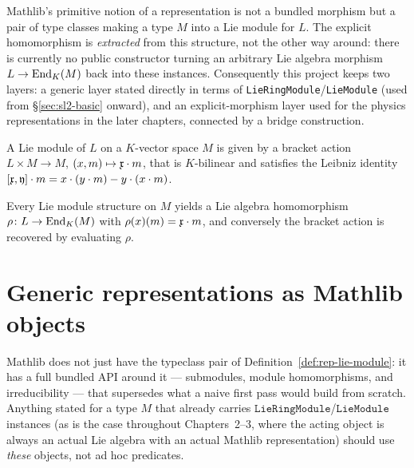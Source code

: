 Mathlib's primitive notion of a representation is not a bundled morphism but
a pair of type classes making a type $M$ into a Lie module for $L$. The
explicit homomorphism is \emph{extracted} from this structure, not the other
way around: there is currently no public constructor turning an arbitrary Lie
algebra morphism $L \to \operatorname{End}_K(M)$ back into these instances. Consequently
this project keeps two layers: a generic layer stated directly in terms of
\texttt{LieRingModule}/\texttt{LieModule} (used from \S\ref{sec:sl2-basic}
onward), and an explicit-morphism layer used for the physics representations
in the later chapters, connected by a bridge construction.

\begin{definition}
  \label{def:rep-lie-module}
  \mathlibok
  A Lie module of $L$ on a $K$-vector space $M$ is given by a bracket action
  $L \times M \to M$, $(x, m) \mapsto \mathfrak{x}\cdot m$, that is $K$-bilinear
  and satisfies the Leibniz identity
  $\mathfrak{[x,y]}\cdot m = x \cdot (y \cdot m) - y \cdot (x \cdot m)$.
\end{definition}

\begin{definition}
  \label{def:rep-to-end}
  \mathlibok
  Every Lie module structure on $M$ yields a Lie algebra homomorphism
  $\rho \colon L \to \operatorname{End}_K(M)$ with $\rho(x)(m) = \mathfrak{x}\cdot m$, and
  conversely the bracket action is recovered by evaluating $\rho$.
\end{definition}

\section{Generic representations as Mathlib objects}
\label{sec:rep-generic}

Mathlib does not just have the typeclass pair of
Definition~\ref{def:rep-lie-module}: it has a full bundled API around it ---
submodules, module homomorphisms, and irreducibility --- that supersedes what
a naive first pass would build from scratch. Anything stated for a type $M$
that already carries $\texttt{LieRingModule}$/$\texttt{LieModule}$ instances
(as is the case throughout Chapters~2--3, where the acting object is always
an actual Lie algebra with an actual Mathlib representation) should use
\emph{these} objects, not ad hoc predicates.

